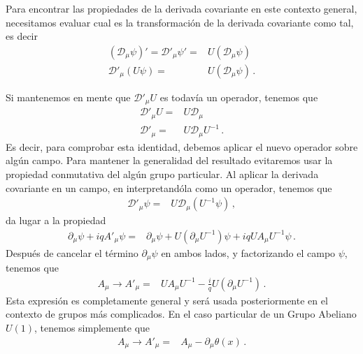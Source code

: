 \begin{frame}
Para encontrar las propiedades de la derivada covariante en este contexto general, necesitamos evaluar cual es la transformación de la derivada covariante como tal, es decir
\begin{align}
 \left(\mathcal{D}_\mu \psi\right)'=     \mathcal{D}'_\mu \psi'=&U\left(\mathcal{D}_\mu \psi\right)\nonumber\\
    \mathcal{D}'_\mu \left( U\psi \right)=&U\left(\mathcal{D}_\mu \psi\right)\,.
\end{align}

Si mantenemos en mente que  $\mathcal{D}'_\mu U$ es todavía un operador, tenemos que
\begin{align}
    \mathcal{D}'_\mu U=&U\mathcal{D}_\mu \nonumber\\
    \mathcal{D}'_\mu =&U\mathcal{D}_\mu U^{-1} \,.
\end{align}
Es decir, para comprobar esta identidad, debemos aplicar el nuevo operador sobre algún campo. Para mantener la generalidad del resultado evitaremos usar la propiedad conmutativa del algún grupo particular. Al aplicar la derivada covariante en un campo, en interpretandóla como un operador, tenemos que
\begin{align*}
    \mathcal{D}'_\mu \psi =&U\mathcal{D}_\mu \left(U^{-1}\psi  \right)\,,
\end{align*}
da lugar a la propiedad
\begin{align}
    \partial_{\mu}\psi+iq A'_{\mu} \psi =&\partial_{\mu}\psi+U\left( \partial_{\mu}U^{-1} \right)\psi+iq  U A_{\mu}U^{-1}\psi\,.
\end{align}
Después de cancelar el término  $\partial_{\mu}\psi$ en ambos lados, y factorizando el campo  $\psi$, tenemos que
\begin{align}
       A_{\mu}\to A'_{\mu} =&U A_{\mu}U^{-1}-\frac{i}{q}U\left( \partial_{\mu}U^{-1} \right)\,.
\end{align}
Esta expresión es completamente general y será usada posteriormente en el contexto de grupos más complicados. En el caso particular de un Grupo Abeliano  $U(1)$, tenemos simplemente que
\begin{align}
 A_{\mu}\to  A'_{\mu}=&A_{\mu}-\partial_{\mu}\theta(x)\,.
\end{align}


\end{frame}
